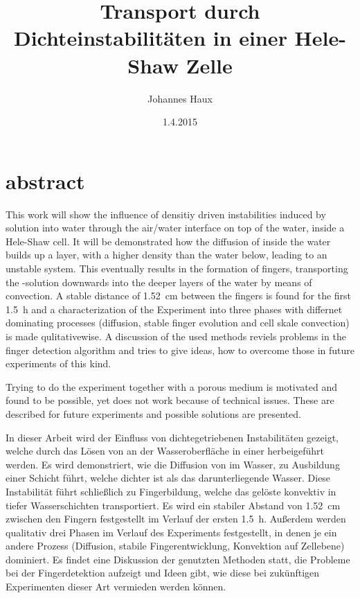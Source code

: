 \documentclass[twoside, a4paper, DIV=11,twocolumn]{book}
\title{Transport durch Dichteinstabilitäten in einer Hele-Shaw Zelle}
\author{Johannes Haux}
\date{1.4.2015}
\begin{document}
\onecolumn


\chapter*{abstract}
 
  This work will show the influence of densitiy driven instabilities induced by \COT solution into water through the air/water interface on top of the water, inside a Hele-Shaw cell. It will be demonstrated how the diffusion of \COT inside the water builds up a layer, with a higher density than the water below, leading to an unstable system. This eventually results in the formation of fingers, transporting the \COT-solution downwards into the deeper layers of the water by means of convection. A stable distance of \SI[round-precision=2]{1.52}{\centi\meter} between the fingers is found for the first \SI[round-precision=2]{1.5}{\hour} and a characterization of the Experiment into three phases with differnet dominating processes (diffusion, stable finger evolution and cell skale convection) is made qulitativewise.
  A discussion of the used methods reviels problems in the finger detection algorithm and tries to give ideas, how to overcome those in future experiments of this kind.
  
  Trying to do the experiment together with a porous medium is motivated and found to be possible, yet does not work because of technical issues. These are described for future experiments and possible solutions are presented.
  
  \vspace{1.5cm}
  In dieser Arbeit wird der Einfluss von dichtegetriebenen Instabilitäten gezeigt, welche durch das Lösen von \COT an der Wasseroberfläche in einer \HSC herbeigeführt werden. Es wird demonstriert, wie die Diffusion von \COT im Wasser, zu Ausbildung einer Schicht führt, welche dichter ist als das darunterliegende Wasser. Diese Instabilität führt schließlich zu Fingerbildung, welche das gelöste \COT konvektiv in tiefer Wasserschichten transportiert. Es wird ein stabiler Abstand von \SI[round-precision=2]{1,52}{\centi\meter} zwischen den Fingern festgestellt im Verlauf der ersten \SI[round-precision=1]{1,5}{\hour}. Außerdem werden qualitativ drei Phasen im Verlauf des Experiments festgestellt, in denen je ein andere Prozess (Diffusion, stabile Fingerentwicklung, Konvektion auf Zellebene) dominiert.
  Es findet eine Diskussion der genutzten Methoden statt, die Probleme bei der Fingerdetektion aufzeigt und Ideen gibt, wie diese bei zukünftigen Experimenten dieser Art vermieden werden können.
  
\end{document}
